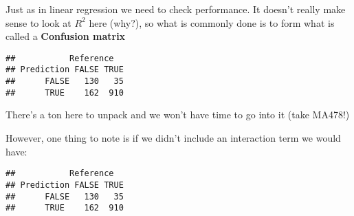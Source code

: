 \documentclass[
]{article}
\newenvironment{Shaded}{\begin{snugshade}}{\end{snugshade}}
\newcommand{\AttributeTok}[1]{\textcolor[rgb]{0.77,0.63,0.00}{#1}}
\newcommand{\DecValTok}[1]{\textcolor[rgb]{0.00,0.00,0.81}{#1}}
\newcommand{\FloatTok}[1]{\textcolor[rgb]{0.00,0.00,0.81}{#1}}
\newcommand{\FunctionTok}[1]{\textcolor[rgb]{0.00,0.00,0.00}{#1}}
\newcommand{\NormalTok}[1]{#1}
\newcommand{\OtherTok}[1]{\textcolor[rgb]{0.56,0.35,0.01}{#1}}
\newcommand{\SpecialCharTok}[1]{\textcolor[rgb]{0.00,0.00,0.00}{#1}}
\newcommand{\StringTok}[1]{\textcolor[rgb]{0.31,0.60,0.02}{#1}}
\begin{document}
Just as in linear regression we need to check performance. It doesn't
really make sense to look at \(R^2\) here (why?), so what is commonly
done is to form what is called a \textbf{Confusion matrix}

\begin{Shaded}
\end{Shaded}

\begin{verbatim}
##           Reference
## Prediction FALSE TRUE
##      FALSE   130   35
##      TRUE    162  910
\end{verbatim}

There's a ton here to unpack and we won't have time to go into it (take
MA478!)

However, one thing to note is if we didn't include an interaction term
we would have:

\begin{Shaded}
\end{Shaded}

\begin{verbatim}
##           Reference
## Prediction FALSE TRUE
##      FALSE   130   35
##      TRUE    162  910
\end{verbatim}
\end{document}
